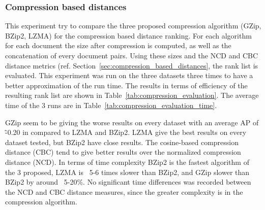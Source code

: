 \subsubsection{Compression based distances}

This experiment try to compare the three proposed compression algorithm (GZip, BZip2, LZMA) for the compression based distance ranking.
For each algorithm for each document the size after compression is computed, as well as the concatenation of every document pairs.
Using these sizes and the NCD and CBC distance metrics (ref. Section~\ref{sec:compression_based_distances}, the rank list is evaluated.
This experiment was run on the three datasets three times to have a better approximation of the run time.
The results in terms of efficiency of the resulting rank list are shown in Table~\ref{tab:compression_evaluation}.
The average time of the 3 runs are in Table~\ref{tab:compression_evaluation_time}.

GZip seem to be giving the worse results on every dataset with an average AP of \~-0.20 in compared to LZMA and BZip2.
LZMA give the best results on every dataset tested, but BZip2 have close results.
The cosine-based compression distance (CBC) tend to give better results over the normalized compression distance (NCD).
In terms of time complexity BZip2 is the fastest algorithm of the 3 proposed, LZMA is ~5-6 times slower than BZip2, and GZip slower than BZip2 by around ~5-20\%.
No significant time differences was recorded between the NCD and CBC distance measures, since the greater complexity is in the compression algorithm.


